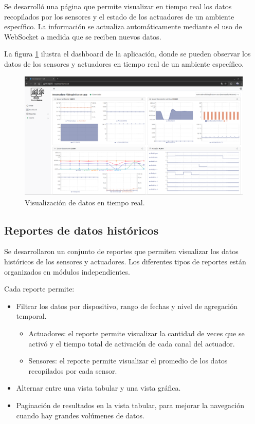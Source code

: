 Se desarrolló una página que permite visualizar en tiempo real los datos
recopilados por los sensores y el estado de los actuadores de un ambiente
específico. La información se actualiza automáticamente mediante el uso de
WebSocket a medida que se reciben nuevos datos.

La figura \ref{fig:dashboard_sistema} ilustra el dashboard de la aplicación,
donde se pueden observar los datos de los sensores y actuadores en tiempo real
de un ambiente específico.

\begin{figure}[H]
    \centering
    \includegraphics[width=\textwidth]{./Images/27_dashboard.png}
    \caption{Visualización de datos en tiempo real.}
    \label{fig:dashboard_sistema}
\end{figure}

\subsection{Reportes de datos históricos}

Se desarrollaron un conjunto de reportes que permiten visualizar los datos
históricos de los sensores y actuadores. Los diferentes tipos de reportes están
organizados en módulos independientes.

Cada reporte permite:
\begin{itemize}
    \item Filtrar los datos por dispositivo, rango de fechas y nivel de agregación
          temporal.
          \begin{itemize}
              \item Actuadores: el reporte permite visualizar la cantidad de veces que se activó y
                    el tiempo total de activación de cada canal del actuador.
              \item Sensores: el reporte permite visualizar el promedio de los datos recopilados
                    por cada sensor.
          \end{itemize}
    \item Alternar entre una vista tabular y una vista gráfica.
    \item Paginación de resultados en la vista tabular, para mejorar la navegación cuando
          hay grandes volúmenes de datos.
\end{itemize}

